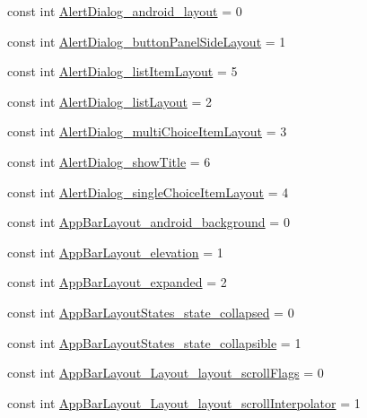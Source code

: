 \begin{CompactItemize}
\item 
const int \hyperlink{class__2doo_1_1_droid_1_1_resource_1_1_styleable_f0becc9b1ab89fad9c3d38039a1bda53}{AlertDialog\_\-android\_\-layout} = 0
\item 
const int \hyperlink{class__2doo_1_1_droid_1_1_resource_1_1_styleable_6365d888a76ef45276dc4e24100465cf}{AlertDialog\_\-buttonPanelSideLayout} = 1
\item 
const int \hyperlink{class__2doo_1_1_droid_1_1_resource_1_1_styleable_432b6003163a07b2fe2c6ab413adcf08}{AlertDialog\_\-listItemLayout} = 5
\item 
const int \hyperlink{class__2doo_1_1_droid_1_1_resource_1_1_styleable_265bf36a1f36f4b1863d5481084b417c}{AlertDialog\_\-listLayout} = 2
\item 
const int \hyperlink{class__2doo_1_1_droid_1_1_resource_1_1_styleable_cdbd061363a0a77674a5cb9370378833}{AlertDialog\_\-multiChoiceItemLayout} = 3
\item 
const int \hyperlink{class__2doo_1_1_droid_1_1_resource_1_1_styleable_2f42632c91589b34742e3db7f335a160}{AlertDialog\_\-showTitle} = 6
\item 
const int \hyperlink{class__2doo_1_1_droid_1_1_resource_1_1_styleable_ed287d0e517c3921dfd60f477c649f2d}{AlertDialog\_\-singleChoiceItemLayout} = 4
\item 
const int \hyperlink{class__2doo_1_1_droid_1_1_resource_1_1_styleable_69a735a8cc4c678bfe5693a8de90c49f}{AppBarLayout\_\-android\_\-background} = 0
\item 
const int \hyperlink{class__2doo_1_1_droid_1_1_resource_1_1_styleable_12cb3611a79042d547039c13d1041852}{AppBarLayout\_\-elevation} = 1
\item 
const int \hyperlink{class__2doo_1_1_droid_1_1_resource_1_1_styleable_182908078b35f990d484c3f2f3664348}{AppBarLayout\_\-expanded} = 2
\item 
const int \hyperlink{class__2doo_1_1_droid_1_1_resource_1_1_styleable_4a4856a3d3ffbf09668122a15e409f4f}{AppBarLayoutStates\_\-state\_\-collapsed} = 0
\item 
const int \hyperlink{class__2doo_1_1_droid_1_1_resource_1_1_styleable_453ddf898de27d39580edf02da6c4994}{AppBarLayoutStates\_\-state\_\-collapsible} = 1
\item 
const int \hyperlink{class__2doo_1_1_droid_1_1_resource_1_1_styleable_6c48db8b57e34a0a70c5edbf7f825a79}{AppBarLayout\_\-Layout\_\-layout\_\-scrollFlags} = 0
\item 
const int \hyperlink{class__2doo_1_1_droid_1_1_resource_1_1_styleable_71c4caa13d3716c56f156cb0a3ed3e0e}{AppBarLayout\_\-Layout\_\-layout\_\-scrollInterpolator} = 1

\end{CompactItemize}
